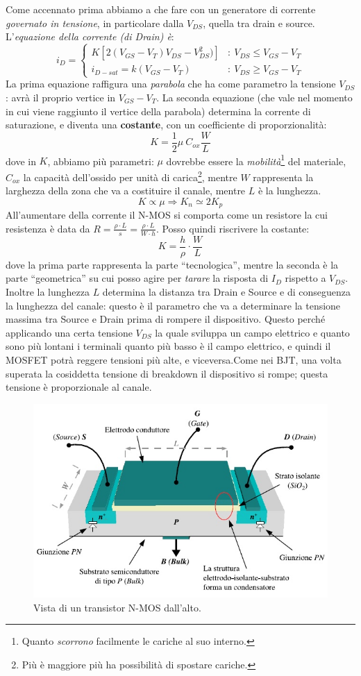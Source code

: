 \documentclass[
]{book}
\begin{document}
Come accennato prima abbiamo a che fare con un generatore di corrente
\emph{governato in tensione}, in particolare dalla \(V_{DS}\), quella
tra drain e source. L'\emph{equazione della corrente (di Drain) è}: \[
i_{D}= \left\{ \begin{array}{cl}
K[2(V_{GS}-V_{T})V_{DS}-V^{2}_{DS})] & : \ V_{DS} \leq V_{GS} - V_{T} \\
i_{D-sat}=k(V_{GS}-V_{T}) & : \ V_{DS} \geq V_{GS} - V_{T}
\end{array} \right.
\] La prima equazione raffigura una \emph{parabola} che ha come
parametro la tensione \(V_{DS}\): avrà il proprio vertice in
\(V_{GS}-V_{T}\). La seconda equazione (che vale nel momento in cui
viene raggiunto il vertice della parabola) determina la corrente di
saturazione, e diventa una \textbf{costante}, con un coefficiente di
proporzionalità: \[
K=\frac{1}{2}\mu\:C_{ox}\frac{W}{L}
\] dove in \(K\), abbiamo più parametri: \(\mu\) dovrebbe essere la
\emph{mobilità}\footnote{Quanto \emph{scorrono} facilmente le cariche al
  suo interno.} del materiale, \(C_{ox}\) la capacità dell'ossido per
unità di carica\footnote{Più è maggiore più ha possibilità di spostare
  cariche.}, mentre \(W\) rappresenta la larghezza della zona che va a
costituire il canale, mentre \(L\) è la lunghezza. \[
K\propto \mu \Rightarrow K_{n}\simeq 2K_{p}
\] All'aumentare della corrente il N-MOS si comporta come un resistore
la cui resistenza è data da
\(R=\frac{\rho\cdot L}{s}=\frac{\rho\cdot L}{W\cdot h}\). Posso quindi
riscrivere la costante: \[
K=\frac{h}{\rho}\cdot\frac{W}{L}
\] dove la prima parte rappresenta la parte ``tecnologica'', mentre la
seconda è la parte ``geometrica'' su cui posso agire per \emph{tarare}
la risposta di \(I_D\) rispetto a \(V_{DS}\). Inoltre la lunghezza \(L\)
determina la distanza tra Drain e Source e di conseguenza la lunghezza
del canale: questo è il parametro che va a determinare la tensione
massima tra Source e Drain prima di rompere il dispositivo. Questo
perché applicando una certa tensione \(V_{DS}\) la quale sviluppa un
campo elettrico e quanto sono più lontani i terminali quanto più basso è
il campo elettrico, e quindi il MOSFET potrà reggere tensioni più alte,
e viceversa.\newline Come nei BJT, una volta superata la cosiddetta
tensione di breakdown il dispositivo si rompe; questa tensione è
proporzionale al canale.

\begin{figure}
\centering
\includegraphics[width=0.5\linewidth,height=\textheight,keepaspectratio]{assets/imgs/nmos_dall_alto.png}
\caption{Vista di un transistor N-MOS dall'alto.}
\end{figure}
\end{document}

